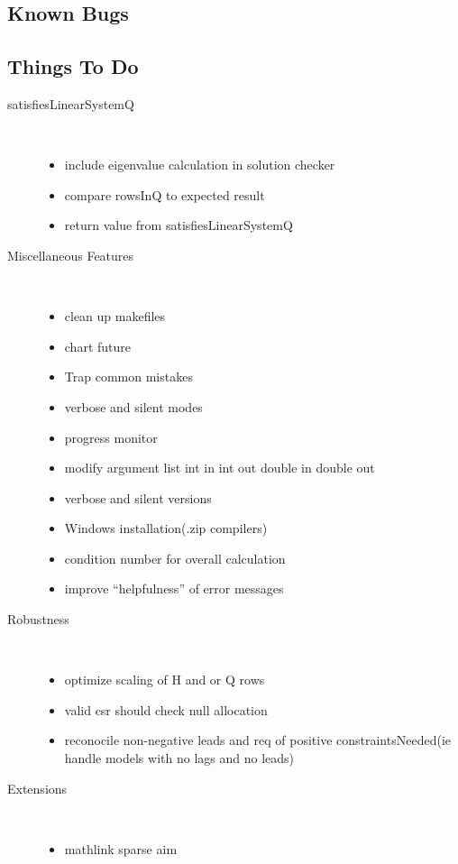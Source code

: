 \documentclass{article}
\begin{document}
\subsection{Known Bugs}
\label{sec:knownbugs}


\subsection{Things To Do}
\label{sec:thingtodo}
\begin{description}
\item[satisfiesLinearSystemQ] \ 
  \begin{itemize}
\item include eigenvalue calculation in solution checker
\item compare rowsInQ to expected result
\item return value from satisfiesLinearSystemQ
  \end{itemize}
\item[Miscellaneous Features] \ 
  \begin{itemize}
\item clean up makefiles
\item chart future
\item Trap common mistakes
\item verbose and silent modes
\item progress monitor
\item modify argument list int in int out double in double out
\item verbose and silent versions
\item Windows installation(.zip compilers)
\item condition number for overall calculation
\item improve ``helpfulness'' of error messages
  \end{itemize}
\item[Robustness] \ 
  \begin{itemize}
  \item optimize scaling of H and or Q rows
\item valid csr should check null allocation
\item reconocile non-negative leads and req of positive constraintsNeeded(ie handle models with no lags and no leads)
  \end{itemize}
\item[Extensions] \ 
  \begin{itemize}
\item mathlink sparse aim

\end{itemize}
\end{description}
\end{document}

